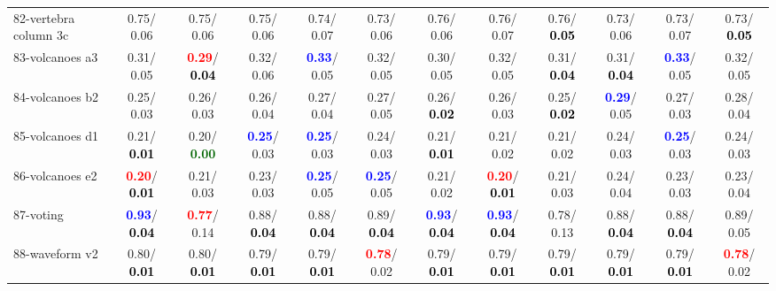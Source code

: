 \begin{table}[h]
\begin{center}
{\begin{tabular}{lc|c|c|c|c|c|c|c|c|c|c}
82-vertebra column 3c &   0.75/  0.06 &   0.75/  0.06 &   0.75/  0.06 &   0.74/  0.07 &   0.73/  0.06 &   0.76/  0.06 &   0.76/  0.07 &   0.76/\textcolor{black}{\textbf{  0.05}} &   0.73/  0.06 &   0.73/  0.07 &   0.73/\textcolor{black}{\textbf{  0.05}} \\
83-volcanoes a3 &   0.31/  0.05 & \textcolor{red}{\textbf{  0.29}}/\textcolor{black}{\textbf{  0.04}} &   0.32/  0.06 & \textcolor{blue}{\textbf{  0.33}}/  0.05 &   0.32/  0.05 &   0.30/  0.05 &   0.32/  0.05 &   0.31/\textcolor{black}{\textbf{  0.04}} &   0.31/\textcolor{black}{\textbf{  0.04}} & \textcolor{blue}{\textbf{  0.33}}/  0.05 &   0.32/  0.05 \\
84-volcanoes b2 &   0.25/  0.03 &   0.26/  0.03 &   0.26/  0.04 &   0.27/  0.04 &   0.27/  0.05 &   0.26/\textcolor{black}{\textbf{  0.02}} &   0.26/  0.03 &   0.25/\textcolor{black}{\textbf{  0.02}} & \textcolor{blue}{\textbf{  0.29}}/  0.05 &   0.27/  0.03 &   0.28/  0.04 \\
85-volcanoes d1 &   0.21/\textcolor{black}{\textbf{  0.01}} &   0.20/\textcolor{darkgreen}{\textbf{  0.00}} & \textcolor{blue}{\textbf{  0.25}}/  0.03 & \textcolor{blue}{\textbf{  0.25}}/  0.03 &   0.24/  0.03 &   0.21/\textcolor{black}{\textbf{  0.01}} &   0.21/  0.02 &   0.21/  0.02 &   0.24/  0.03 & \textcolor{blue}{\textbf{  0.25}}/  0.03 &   0.24/  0.03 \\ \hline
86-volcanoes e2 & \textcolor{red}{\textbf{  0.20}}/\textcolor{black}{\textbf{  0.01}} &   0.21/  0.03 &   0.23/  0.03 & \textcolor{blue}{\textbf{  0.25}}/  0.05 & \textcolor{blue}{\textbf{  0.25}}/  0.05 &   0.21/  0.02 & \textcolor{red}{\textbf{  0.20}}/\textcolor{black}{\textbf{  0.01}} &   0.21/  0.03 &   0.24/  0.04 &   0.23/  0.03 &   0.23/  0.04 \\
87-voting & \textcolor{blue}{\textbf{  0.93}}/\textcolor{black}{\textbf{  0.04}} & \textcolor{red}{\textbf{  0.77}}/  0.14 &   0.88/\textcolor{black}{\textbf{  0.04}} &   0.88/\textcolor{black}{\textbf{  0.04}} &   0.89/\textcolor{black}{\textbf{  0.04}} & \textcolor{blue}{\textbf{  0.93}}/\textcolor{black}{\textbf{  0.04}} & \textcolor{blue}{\textbf{  0.93}}/\textcolor{black}{\textbf{  0.04}} &   0.78/  0.13 &   0.88/\textcolor{black}{\textbf{  0.04}} &   0.88/\textcolor{black}{\textbf{  0.04}} &   0.89/  0.05 \\
88-waveform v2 &   0.80/\textcolor{black}{\textbf{  0.01}} &   0.80/\textcolor{black}{\textbf{  0.01}} &   0.79/\textcolor{black}{\textbf{  0.01}} &   0.79/\textcolor{black}{\textbf{  0.01}} & \textcolor{red}{\textbf{  0.78}}/  0.02 &   0.79/\textcolor{black}{\textbf{  0.01}} &   0.79/\textcolor{black}{\textbf{  0.01}} &   0.79/\textcolor{black}{\textbf{  0.01}} &   0.79/\textcolor{black}{\textbf{  0.01}} &   0.79/\textcolor{black}{\textbf{  0.01}} & \textcolor{red}{\textbf{  0.78}}/  0.02 \\

\end{tabular}}
\end{center}
\end{table}
